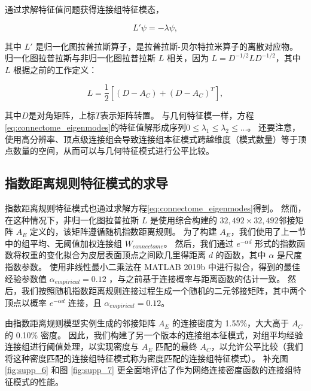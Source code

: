 \documentclass[lang=cn,a4paper,newtx]{elegantpaper}
\begin{document}
通过求解特征值问题获得连接组特征模态，


\begin{equation}\label{eq:connectome_eigenmodes}
	L' \psi = - \lambda \psi,
\end{equation}

其中 $ L' $ 是归一化图拉普拉斯算子，是拉普拉斯-贝尔特拉米算子的离散对应物。
归一化图拉普拉斯与非归一化图拉普拉斯 $ L $ 相关，因为 $ L = D^{−1/2}LD^{−1/2} $，其中 $ L $ 根据之前的工作\cite{levy2006laplace}定义：

\begin{equation}\label{eq:unnormalized_Laplacian}
	L = \frac{1}{2} [ (D-A_C) + (D-A_C)^T ],
\end{equation}

其中$ D $是对角矩阵，上标$ T $表示矩阵转置。
与几何特征模一样，方程\ref{eq:connectome_eigenmodes}的特征值解形成序列$ 0 \leq \lambda_1 \leq \lambda_2 \leq ... $。
还要注意，使用高分辨率、顶点级连接组会导致连接组本征模式跨越维度（模式数量）等于顶点数量的空间，从而可以与几何特征模式进行公平比较。



\subsection{指数距离规则特征模式的求导} \label{sec:EDR_derivation}

指数距离规则特征模式也通过求解方程\ref{eq:connectome_eigenmodes}得到。
然而，在这种情况下，非归一化图拉普拉斯 $ L $ 是使用综合构建的 $ 32,492 \times 32,492  $邻接矩阵 $ A_E $ 定义的，该矩阵遵循随机指数距离规则。
为了构建 $ A_E $，我们使用了上一节中的组平均、无阈值加权连接组 $ W_{connectome} $。
然后，我们通过 $ e^{-\alpha d} $ 形式的指数函数将权重的变化拟合为皮层表面顶点之间欧几里得距离 $ d $ 的函数，其中 $ \alpha $ 是尺度指数参数。
使用非线性最小二乘法在 MATLAB 2019b 中进行拟合，得到的最佳经验参数值 $ \alpha_{empirical} = 0.12 $ ，与之前基于连接概率与距离函数的估计一致\cite{theodoni2022structural}。
然后，我们按照随机指数距离规则连接过程生成一个随机的二元邻接矩阵，其中两个顶点以概率 $ e^{-\alpha d} $ 连接，且 $ \alpha_{empirical} = 0.12 $。


由指数距离规则模型实例生成的邻接矩阵 $ A_E $ 的连接密度为 1.55\%，大大高于 $ A_C $ 的 0.10\% 密度。
因此，我们构建了另一个版本的连接组本征模式，对组平均经验连接组进行阈值处理，以实现密度与 $ A_E $ 匹配的最终 $ A_C $，以允许公平比较（我们将这种密度匹配的连接组特征模式称为密度匹配的连接组特征模式）。
补充图\ref{fig:supp_6} 和图 \ref{fig:supp_7} 更全面地评估了作为网络连接密度函数的连接组特征模式的性能。
\end{document}
